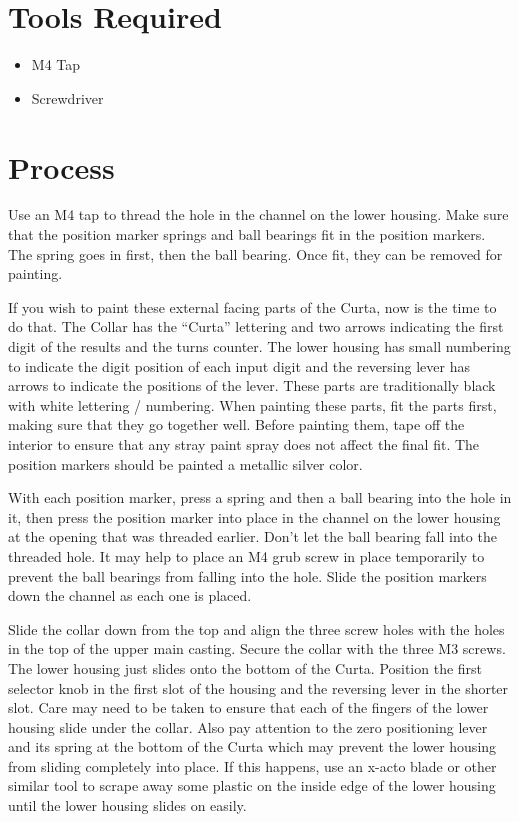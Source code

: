 \documentclass[openany]{book}
\begin{document}
\section{Tools Required}
\begin{itemize}
	\item M4 Tap
	\item Screwdriver
\end{itemize}


\section{Process}
Use an M4 tap to thread the hole in the channel on the lower housing. Make sure that the position marker springs and ball bearings fit in the position markers. The spring goes in first, then the ball bearing. Once fit, they can be removed for painting.

If you wish to paint these external facing parts of the Curta, now is the time to do that. The Collar has the “Curta” lettering and two arrows indicating the first digit of the results and the turns counter. The lower housing has small numbering to indicate the digit position of each input digit and the reversing lever has arrows to indicate the positions of the lever. These parts are traditionally black with white lettering / numbering. When painting these parts, fit the parts first, making sure that they go together well. Before painting them, tape off the interior to ensure that any stray paint spray does not affect the final fit. The position markers should be painted a metallic silver color.

With each position marker, press a spring and then a ball bearing into the hole in it, then press the position marker into place in the channel on the lower housing at the opening that was threaded earlier. Don't let the ball bearing fall into the threaded hole. It may help to place an M4 grub screw in place temporarily to prevent the ball bearings from falling into the hole. Slide the position markers down the channel as each one is placed.

Slide the collar down from the top and align the three screw holes with the holes in the top of the upper main casting. Secure the collar with the three M3 screws. The lower housing just slides onto the bottom of the Curta. Position the first selector knob in the first slot of the housing and the reversing lever in the shorter slot. Care may need to be taken to ensure that each of the fingers of the lower housing slide under the collar. Also pay attention to the zero positioning lever and its spring at the bottom of the Curta which may prevent the lower housing from sliding completely into place. If this happens, use an x-acto blade or other similar tool to scrape away some plastic on the inside edge of the lower housing until the lower housing slides on easily.
\end{document}
